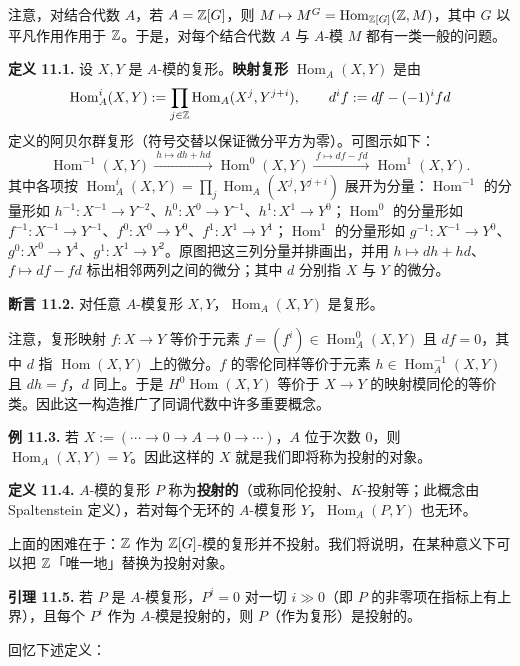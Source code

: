 注意，对结合代数 $A$，若 $A=\mathbb{Z}[G]$，则 $M\mapsto M^G=\operatorname{Hom}_{\mathbb{Z}[G]}(\mathbb{Z},M)$，其中 $G$ 以平凡作用作用于 $\mathbb{Z}$。于是，对每个结合代数 $A$ 与 $A$-模 $M$ 都有一类一般的问题。

\textbf{定义 11.1.} 设 $X,Y$ 是 $A$-模的复形。\textbf{映射复形} $\operatorname{Hom}_A(X,Y)$ 是由
\[
\operatorname{Hom}_A^i(X,Y):=\prod_{j\in\mathbb{Z}}\operatorname{Hom}_A(X^j,Y^{j+i}),\qquad d^if:=df-(-1)^ifd
\]
定义的阿贝尔群复形（符号交替以保证微分平方为零）。可图示如下：
\[
\operatorname{Hom}^{-1}(X,Y)\xrightarrow{\ h\mapsto dh+hd\ }\operatorname{Hom}^0(X,Y)\xrightarrow{\ f\mapsto df-fd\ }\operatorname{Hom}^1(X,Y).
\]
其中各项按 $\operatorname{Hom}_A^i(X,Y)=\prod_j\operatorname{Hom}_A(X^j,Y^{j+i})$ 展开为分量：$\operatorname{Hom}^{-1}$ 的分量形如 $h^{-1}\colon X^{-1}\to Y^{-2}$、$h^0\colon X^0\to Y^{-1}$、$h^1\colon X^1\to Y^0$；$\operatorname{Hom}^0$ 的分量形如 $f^{-1}\colon X^{-1}\to Y^{-1}$、$f^0\colon X^0\to Y^0$、$f^1\colon X^1\to Y^1$；$\operatorname{Hom}^1$ 的分量形如 $g^{-1}\colon X^{-1}\to Y^0$、$g^0\colon X^0\to Y^1$、$g^1\colon X^1\to Y^2$。原图把这三列分量并排画出，并用 $h\mapsto dh+hd$、$f\mapsto df-fd$ 标出相邻两列之间的微分；其中 $d$ 分别指 $X$ 与 $Y$ 的微分。

\textbf{断言 11.2.} 对任意 $A$-模复形 $X,Y$，$\operatorname{Hom}_A(X,Y)$ 是复形。

注意，复形映射 $f\colon X\to Y$ 等价于元素 $f=(f^i)\in\operatorname{Hom}^0_A(X,Y)$ 且 $df=0$，其中 $d$ 指 $\operatorname{Hom}(X,Y)$ 上的微分。$f$ 的零伦同样等价于元素 $h\in\operatorname{Hom}^{-1}_A(X,Y)$ 且 $dh=f$，$d$ 同上。于是 $H^0\operatorname{Hom}(X,Y)$ 等价于 $X\to Y$ 的映射模同伦的等价类。因此这一构造推广了同调代数中许多重要概念。

\textbf{例 11.3.} 若 $X:=(\cdots\to0\to A\to0\to\cdots)$，$A$ 位于次数 $0$，则 $\operatorname{Hom}_A(X,Y)=Y$。因此这样的 $X$ 就是我们即将称为投射的对象。

\textbf{定义 11.4.} $A$-模的复形 $P$ 称为\textbf{投射的}（或称同伦投射、$K$-投射等；此概念由 Spaltenstein 定义），若对每个无环的 $A$-模复形 $Y$，$\operatorname{Hom}_A(P,Y)$ 也无环。

上面的困难在于：$\mathbb{Z}$ 作为 $\mathbb{Z}[G]$-模的复形并不投射。我们将说明，在某种意义下可以把 $\mathbb{Z}$「唯一地」替换为投射对象。

\textbf{引理 11.5.} 若 $P$ 是 $A$-模复形，$P^i=0$ 对一切 $i\gg0$（即 $P$ 的非零项在指标上有上界），且每个 $P^i$ 作为 $A$-模是投射的，则 $P$（作为复形）是投射的。

回忆下述定义：

